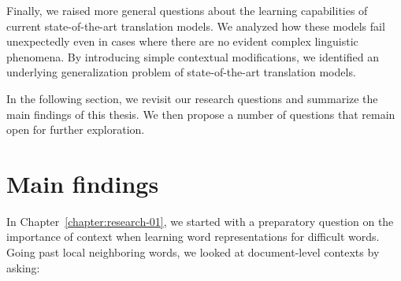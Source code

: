 Finally, we raised more general questions about the learning capabilities of current state-of-the-art translation models.
We analyzed how these models fail unexpectedly even in cases where there are no evident complex linguistic phenomena. 
By introducing simple contextual modifications, we identified an underlying generalization problem of state-of-the-art translation models.

In the following section, we revisit our research questions and summarize the main findings of this thesis.
We then propose a number of questions that remain open for further exploration. 

\section{Main findings}


In Chapter~\ref{chapter:research-01}, we started with a preparatory question on the importance of context when learning word representations for difficult words.
Going past local neighboring words, we looked at document-level contexts by asking:

